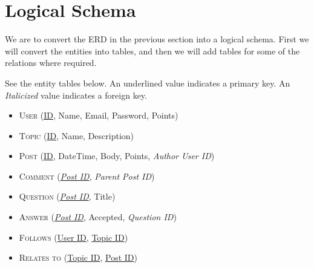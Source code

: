\newcommand{\key}[1]{\underline{#1}}
\newcommand{\fkey}[1]{\textit{#1}}

\section{Logical Schema}

We are to convert the ERD in the previous section into a logical schema. First we will convert the entities into tables, and then we will add tables for some of the relations where required.

See the entity tables below. An underlined value indicates a primary key. An \emph{Italicized} value indicates a foreign key.

\begin{itemize}
	\item[] \textsc{User} (\key{ID}, Name, Email, Password, Points)
	\item[] \textsc{Topic} (\key{ID}, Name, Description)
	\item[] \textsc{Post} (\key{ID}, DateTime, Body, Points, \fkey{Author User ID})
	\item[] \textsc{Comment} (\key{\fkey{Post ID}}, \fkey{Parent Post ID})
	\item[] \textsc{Question} (\key{\fkey{Post ID}}, Title)
	\item[] \textsc{Answer} (\key{\fkey{Post ID}}, Accepted, \fkey{Question ID})
	\item[] \textsc{Follows} (\key{User ID}, \key{Topic ID})
	\item[] \textsc{Relates to} (\key{Topic ID}, \key{Post ID})
\end{itemize}
